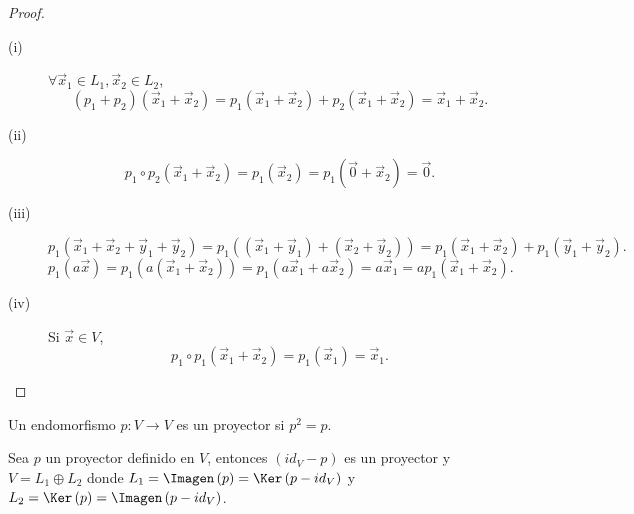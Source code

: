 \begin{proof}
\begin{description}
\item[(i)] $\displaystyle \forall \vec{x}_{1} \in L_{1}, \vec{x}_{2} \in L_{2} $,
\[\left(p_{1}+p_{2}\right)\left(\vec{x}_{1}+\vec{x}_{2}\right) = p_{1}\left(\vec{x}_{1}+\vec{x}_{2}\right) + p_{2}\left(\vec{x}_{1}+\vec{x}_{2}\right) = \vec{x}_{1}+\vec{x}_{2} .\]
\item[(ii)] 
\[p_{1} \circ p_{2}\left(\vec{x}_{1}+\vec{x}_{2}\right) = p_{1}\left(\vec{x}_{2}\right) = p_{1}\left(\vec{0}+\vec{x}_{2}\right) = \vec{0} .\]
\item[(iii)] \[ p_{1}\left(\vec{x}_{1}+\vec{x}_{2} + \vec{y}_{1}+\vec{y}_{2}\right) = p_{1}\left(\left(\vec{x}_{1}+\vec{y}_{1}\right)+\left(\vec{x}_{2}+\vec{y}_{2}\right)\right) = p_{1}\left(\vec{x}_{1}+\vec{x}_{2}\right) + p_{1}\left(\vec{y}_{1}+\vec{y}_{2}\right) .\]
\[p_{1}\left(a\vec{x}\right) = p_{1}\left(a\left(\vec{x}_{1}+\vec{x}_{2}\right)\right) = p_{1}\left(a\vec{x}_{1}+a\vec{x}_{2}\right) = a\vec{x}_{1} = ap_{1}\left(\vec{x}_{1}+\vec{x}_{2}\right) .\]
\item[(iv)] Si $\displaystyle \vec{x} \in V $,
	\[p_{1} \circ p_{1} \left(\vec{x}_{1}+\vec{x}_{2}\right) = p_{1}\left(\vec{x}_{1}\right) = \vec{x}_{1} .\]
\end{description}
\end{proof}

\begin{fdefinition}[]
\normalfont Un endomorfismo $\displaystyle  p : V \to V $ es un proyector si $\displaystyle p^{2} = p $.
\end{fdefinition}

\begin{ftheorem}[]
\normalfont Sea $\displaystyle p $ un proyector definido en $\displaystyle V $, entonces $\displaystyle \left(id_{V} - p\right) $ es un proyector y $\displaystyle V = L_{1}\oplus L_{2} $ donde $\displaystyle L_{1} = \Imagen\left(p\right) = \Ker\left(p- id _{V}\right) $ y $\displaystyle L_{2} = \Ker\left(p\right) = \Imagen\left(p-id _{V}\right) $. 
\end{ftheorem}


